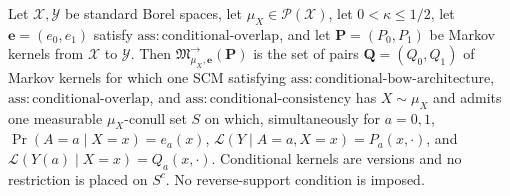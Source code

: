 Let \(\mathcal X,\mathcal Y\) be standard Borel spaces, let \(\mu_X\in\mathcal P(\mathcal X)\), let \(0<\kappa\le1/2\), let \(\boldsymbol e=(e_0,e_1)\) satisfy \(\mathrm{ass:conditional\text{-}overlap}\), and let \(\boldsymbol P=(P_0,P_1)\) be Markov kernels from \(\mathcal X\) to \(\mathcal Y\).  Then \(\mathfrak M^{\to}_{\mu_X,\boldsymbol e}(\boldsymbol P)\) is the set of pairs \(\boldsymbol Q=(Q_0,Q_1)\) of Markov kernels for which one SCM satisfying \(\mathrm{ass:conditional\text{-}bow\text{-}architecture}\), \(\mathrm{ass:conditional\text{-}overlap}\), and \(\mathrm{ass:conditional\text{-}consistency}\) has \(X\sim\mu_X\) and admits one measurable \(\mu_X\)-conull set \(S\) on which, simultaneously for \(a=0,1\), \(\Pr(A=a\mid X=x)=e_a(x)\), \(\mathcal L(Y\mid A=a,X=x)=P_a(x,\cdot)\), and \(\mathcal L(Y(a)\mid X=x)=Q_a(x,\cdot)\).  Conditional kernels are versions and no restriction is placed on \(S^c\).  No reverse-support condition is imposed.